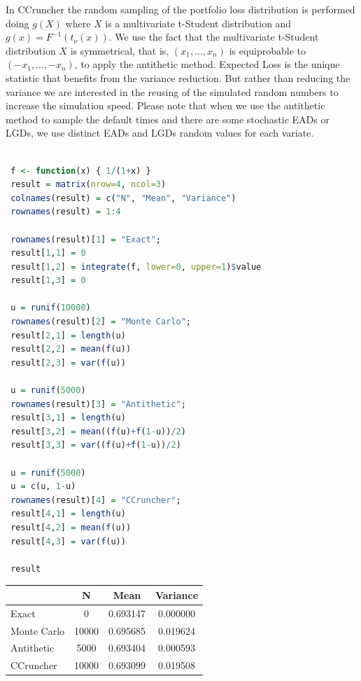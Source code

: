 \documentclass[11pt,fleqn]{book} %
\begin{document}
In CCruncher the random sampling of the portfolio loss distribution is 
performed doing $g(X)$ where $X$ is a multivariate t-Student distribution 
and $g(x) = F^{-1}(t_{\nu}(x))$. We use the fact that the multivariate 
t-Student distribution $X$ is symmetrical, that is, $(x_1,\dots,x_n)$ is 
equiprobable to $(-x_1,\dots,-x_n)$, to apply the antithetic method. 
Expected Loss is the unique statistic that benefits from the variance 
reduction. But rather than reducing the variance we are interested 
in the reusing of the simulated random numbers to increase the simulation 
speed. Please note that when we use the antithetic method to sample the 
default times and there are some stochastic EADs or LGDs, we use distinct 
EADs and LGDs random values for each variate.

\begin{lstlisting}[language=R, label=sc:antithetic, caption=Antithetic example (R script)]

 f <- function(x) { 1/(1+x) }
 result = matrix(nrow=4, ncol=3)
 colnames(result) = c("N", "Mean", "Variance")
 rownames(result) = 1:4

 rownames(result)[1] = "Exact";
 result[1,1] = 0
 result[1,2] = integrate(f, lower=0, upper=1)$value
 result[1,3] = 0

 u = runif(10000)
 rownames(result)[2] = "Monte Carlo";
 result[2,1] = length(u)
 result[2,2] = mean(f(u))
 result[2,3] = var(f(u))

 u = runif(5000)
 rownames(result)[3] = "Antithetic";
 result[3,1] = length(u)
 result[3,2] = mean((f(u)+f(1-u))/2)
 result[3,3] = var((f(u)+f(1-u))/2)

 u = runif(5000)
 u = c(u, 1-u)
 rownames(result)[4] = "CCruncher";
 result[4,1] = length(u)
 result[4,2] = mean(f(u))
 result[4,3] = var(f(u))
 
 result

\end{lstlisting}
\hspace*{1cm}
\begin{tabular}{l|c|c|c|}
	\cline{2-4}
	& N & Mean & Variance \\
	\hline
	\multicolumn{1}{|l|}{Exact} & 0 & 0.693147 & 0.000000 \\
	\hline
	\multicolumn{1}{|l|}{Monte Carlo} & 10000 & 0.695685 & 0.019624 \\
	\hline
	\multicolumn{1}{|l|}{Antithetic} & 5000 & 0.693404 & 0.000593 \\
	\hline
	\multicolumn{1}{|l|}{CCruncher} & 10000 & 0.693099 & 0.019508 \\
	\hline
\end{tabular}
\vspace{11pt}
\end{document}
